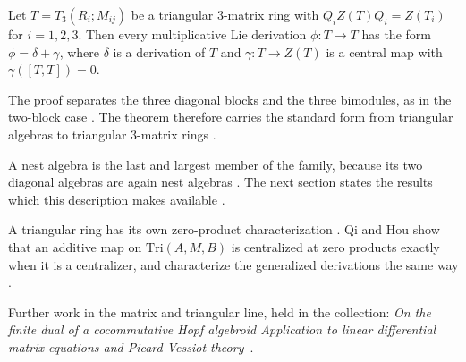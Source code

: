 \begin{theorem}\label{thm:generalized:three-matrix}
Let $T=T_3(R_i;M_{ij})$ be a triangular $3$-matrix ring with
$Q_iZ(T)Q_i=Z(T_i)$ for $i=1,2,3$. Then every multiplicative Lie derivation
$\phi\colon T\to T$ has the form $\phi=\delta+\gamma$, where $\delta$ is a
derivation of $T$ and $\gamma\colon T\to Z(T)$ is a central map with
$\gamma([T,T])=0$.
\end{theorem}

The proof separates the three diagonal blocks and the three bimodules, as in
the two-block case \cite[pp.~5--6]{ChenHou2020}. The theorem therefore carries
the standard form from triangular algebras to triangular $3$-matrix rings
\cite[p.~5]{ChenHou2020}.

A nest algebra is the last and largest member of the family, because its two
diagonal algebras are again nest algebras
\cite[Proposition~19, p.~308]{Cheung2003}. The next section states the results
which this description makes available \cite[p.~308]{Cheung2003}.

A triangular ring has its own zero-product characterization
\cite[Abstract]{QiHou2013Centralizers}. Qi and Hou show that an additive map
on $\mathrm{Tri}(A,M,B)$ is centralized at zero products exactly when it is a
centralizer, and characterize the generalized derivations the same way
\cite[Abstract]{QiHou2013Centralizers}.

Further work in the matrix and triangular line, held in the collection:
\noindent\emph{On the finite dual of a cocommutative Hopf algebroid
Application to linear differential matrix equations and Picard-Vessiot
theory}~\cite{LibOnTheFiniteDual2021}.
